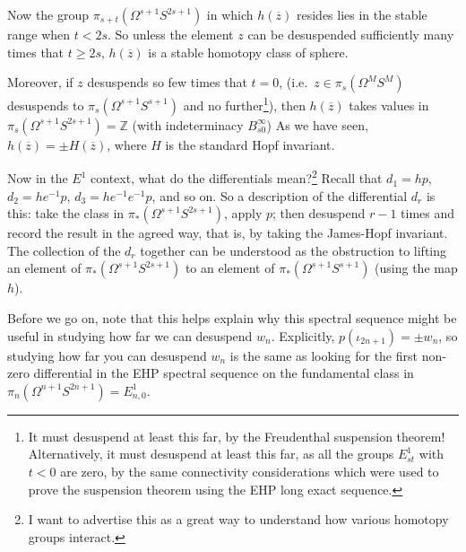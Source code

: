 \documentclass{article}
\newcommand{\Z}{\mathbb{Z}}
\newcommand{\Loops}{\Omega}
\theoremstyle{definition}
\begin{document}
\begin{enumerate}
Now the group $\pi_{s+t}(\Omega^{s+1}S^{2s+1})$ in which $h(\overline z)$ resides lies in the stable range when $t<2s$. So unless the element $z$ can be desuspended sufficiently many times that $t\geq2s$, $h(\overline z)$ is a stable homotopy class of sphere.

Moreover, if $z$ desuspends so few times that $t=0$, (i.e.\ $z\in\pi_s(\Omega^M S^M)$ desuspends to $\pi_s(\Omega^{s+1} S^{s+1})$ and no further\footnote{It must desuspend at least this far, by the Freudenthal suspension theorem! Alternatively, it must desuspend at least this far, as all the groups $E_{st}^1$ with $t<0$ are zero, by the same connectivity considerations which were used to prove the suspension theorem using the EHP long exact sequence.}), then $h(\overline z)$ takes values in $\pi_{s}(\Omega^{s+1}S^{2s+1})=\Z$ (with indeterminacy $B_{s0}^\infty$) As we have seen, $h(\overline z)=\pm H(\overline z)$, where $H$ is the standard Hopf invariant.
\end{enumerate}



Now in the $E^1$ context, what do the differentials mean?\footnote{I want to advertise this as a great way to understand how various homotopy groups interact.}  Recall that $d_1 = hp$, $d_2 = he^{-1} p$, $d_3 = he^{-1} e^{-1} p$, and so on.  So a description of the differential $d_r$ is this: take the class in $\pi_* (\Loops^{s+1} S^{2s+1})$, apply $p$; then desuspend $r-1$ times and record the result in the agreed way, that is, by taking the James-Hopf invariant. The collection of the $d_r$ together can be understood as the obstruction to lifting an element of $\pi_*(\Loops^{s+1} S^{2s+1})$ to an element of $\pi_*(\Loops^{s+1} S^{s+1})$ (using the map $h$).

Before we go on, note that this helps explain why this spectral sequence might be useful in studying how far we can desuspend $w_n$. Explicitly, $p(\iota_{2n+1}) = \pm w_n$, so studying how far you can desuspend $w_n$ is the same as looking for the first non-zero differential in the EHP spectral sequence on the fundamental class in $\pi_n (\Loops^{n+1} S^{2n+1})=E^1_{n,0}$.
\end{document}
